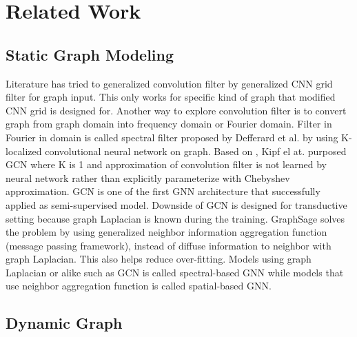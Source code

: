 \documentclass{IEEEtran}
\begin{document}
\section{Related Work}
\label{sec:org4780018}
\subsection{Static Graph Modeling}
\label{sec:orgb828da5}

Literature has tried to generalized convolution filter by generalized CNN grid filter for graph input. This only works for specific kind of graph that modified CNN grid is designed for. Another way to explore convolution filter is to convert graph from graph domain into frequency domain or Fourier domain. Filter in Fourier in domain is called spectral filter proposed by Defferard et al. \cite{defferrard2016convolutional} by using K-localized convolutional neural network on graph. Based on \cite{defferrard2016convolutional}, Kipf el at. \cite{kipf2016semi} purposed GCN where K is 1 and approximation of convolution filter is not learned by neural network rather than explicitly parameterize with Chebyshev approximation. GCN is one of the first GNN architecture that successfully applied as semi-supervised model. Downside of GCN is designed for transductive setting because graph Laplacian is known during the training. GraphSage \cite{hamilton2017inductive} solves the problem by using generalized neighbor information aggregation function (message passing framework), instead of diffuse information to neighbor with graph Laplacian. This also helps reduce over-fitting. Models using graph Laplacian or alike such as GCN is called spectral-based GNN while models that use neighbor aggregation function is called spatial-based GNN.
\subsection{Dynamic Graph}
\label{sec:orgcac09c7}
\end{document}
